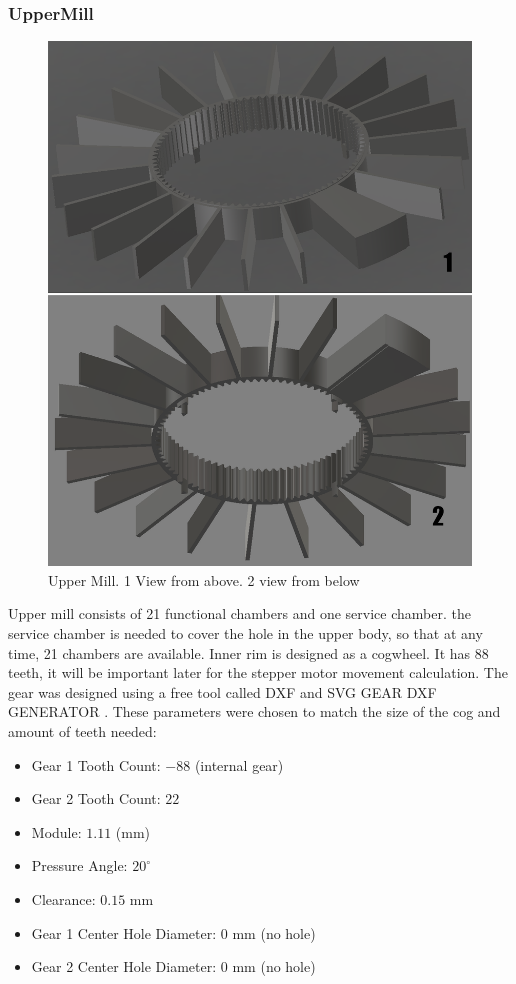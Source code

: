 \subsubsection{UpperMill}
\begin{figure}[h]
	\centering
	\includegraphics[width=0.6\linewidth]{Figures/Uppermill}
	\caption[Upper Mill]{Upper Mill. 1 View from above. 2 view from below}
	\label{fig:uppermill}
\end{figure}
Upper mill consists of 21 functional chambers and one service chamber. the service chamber is needed to cover the hole in the upper body, so that at any time, 21 chambers are available. Inner rim is designed as a  cogwheel. It has 88 teeth, it will be important later for the stepper motor movement calculation. The gear was designed using a free tool called DXF and SVG GEAR DXF GENERATOR \cite{evolvent_spur_gear_generator}.
These parameters were chosen to match the size of the cog and amount of teeth needed: 
\begin{itemize}
	\item Gear 1 Tooth Count: $-88$ (internal gear)
	\item Gear 2 Tooth Count: $22$
	\item Module: $1.11$ (mm)
	\item Pressure Angle: $20^\circ$
	\item Clearance: $0.15$ mm
	\item Gear 1 Center Hole Diameter: $0$ mm (no hole)
	\item Gear 2 Center Hole Diameter: $0$ mm (no hole)
\end{itemize}

